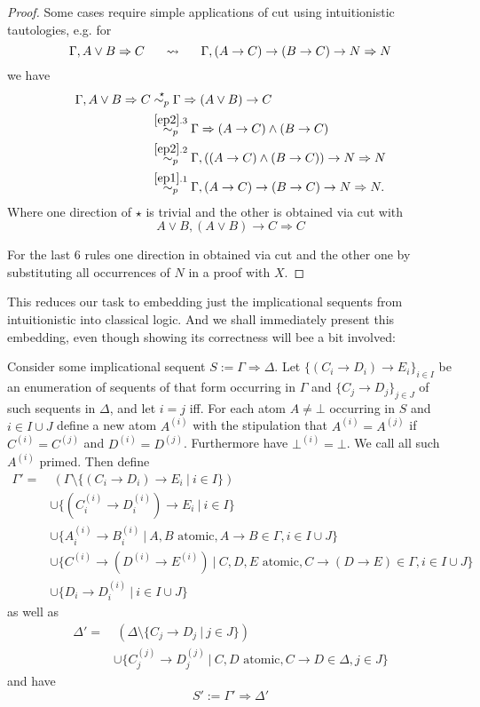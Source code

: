 \documentclass[a4paper,12pt]{article}
\theoremstyle{definition}
\theoremstyle{definition}
\theoremstyle{definition}
\theoremstyle{definition}
\theoremstyle{definition}
\theoremstyle{definition}
\begin{document}
\begin{proof}[Proof]
		Some cases require simple applications of cut using intuitionistic tautologies, e.g. for
		$$\Gamma, A\vee B\Rightarrow C\indent\rightsquigarrow\indent\Gamma, (A\to C)\to (B\to C)\to N\Rightarrow  N$$
		we have 
		\begin{align*}
			\Gamma, A\vee B\Rightarrow C&\overset{\star}{\sim_p}\Gamma\Rightarrow (A\vee B)\to C\\&\overset{\ref{ep2}.3}{\sim_p}\Gamma\Rightarrow (A\to C)\wedge(B\to C)\\&\overset{\ref{ep2}.2}{\sim_p} \Gamma, ((A\to C)\wedge (B\to C))\to N\Rightarrow N\\&\overset{\ref{ep1}.1}{\sim_p}\Gamma, (A\to C)\to(B\to C)\to N\Rightarrow N.
		\end{align*}
		Where one direction of $\star$ is trivial and the other is obtained via cut with $$A\vee B, (A\vee B)\to C\Rightarrow C$$
		
		For the last 6 rules one direction in obtained via cut and the other one by substituting all occurrences of $N$ in a proof with $X$.
	\end{proof}
	
	This reduces our task to embedding just the implicational sequents from intuitionistic into classical logic. And we shall immediately present this embedding, even though showing its correctness will bee a bit involved:
	
	 Consider some implicational sequent $S := \Gamma\Rightarrow \Delta$. Let $\{(C_i\to D_i)\to E_i\}_{i\in I}$ be an enumeration of sequents of that form occurring in $\Gamma$ and $\{C_j\to D_j\}_{j\in J}$ of such sequents in $\Delta$, and let $i = j$ iff. For each atom $A\neq\bot$ occurring in $S$ and $i\in I\cup J$ define a new atom $A^{(i)}$ with the stipulation that $A^{(i)} = A^{(j)}$ if $C^{(i)} = C^{(j)}$ and $D^{(i)} = D^{(j)}$. Furthermore have $\bot^{(i)} = \bot$. We call all such $A^{(i)}$ primed. Then define 
	\begin{align*}
		\Gamma' = &\: (\Gamma\setminus\{(C_{i}\to D_i)\to E_i\:|\:i\in I\})
		\\&\cup \{(C_{i}^{(i)}\to D_i^{(i)})\to E_i\:|\:i\in I\}
		\\&\cup \{A_i^{(i)}\to B_i^{(i)}\:|\: A, B\text{ atomic}, A\to B\in\Gamma, i\in I\cup J\}
		\\&\cup \{C^{(i)}\to (D^{(i)}\to E^{(i)})\:|\: C, D, E\text{ atomic}, C\to (D\to E)\in\Gamma, i\in I\cup J\}
		\\&\cup \{D_i\to D_i^{(i)}\:|\:i\in I\cup J\}
	\end{align*}
as well as
\begin{align*}
	\Delta' = &\:(\Delta\setminus\{C_{j}\to D_j\:|\:j\in J\})
	\\&\cup \{C_j^{(j)}\to D_j^{(j)}\:|\: C, D\text{ atomic}, C\to D\in\Delta, j\in J\}
\end{align*}
and have $$S' := \Gamma' \Rightarrow \Delta' $$
\end{document}
